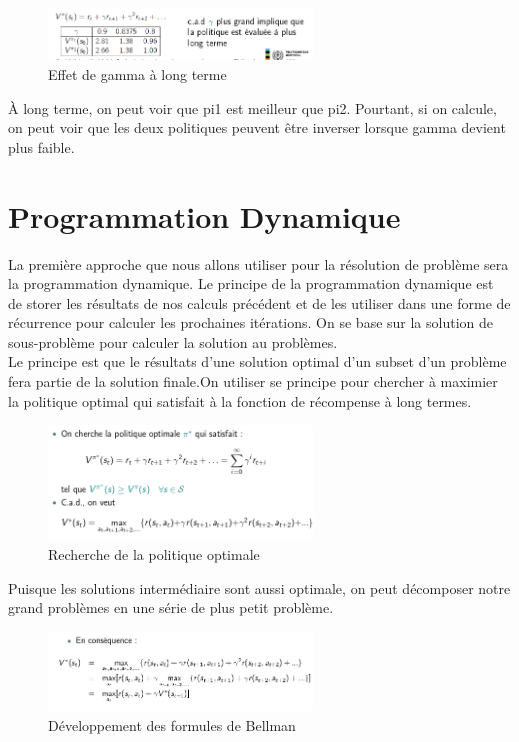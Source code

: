 \documentclass[oneside]{book}
\begin{document}
\begin{figure}[!ht]
\centering
\includegraphics[width = 7cm]{slide7.png}
\caption{Effet de gamma à long terme}
\end{figure}

À long terme, on peut voir que pi1 est meilleur que pi2. Pourtant, si on calcule, on peut voir que les deux politiques peuvent être inverser lorsque gamma devient plus faible. 
\section{Programmation Dynamique}
La première approche que nous allons utiliser pour la résolution de problème sera la programmation dynamique. Le principe de la programmation dynamique est de storer les résultats de nos calculs précédent et de les utiliser dans une forme de récurrence pour calculer les prochaines itérations. On se base sur la solution de sous-problème pour calculer la solution au problèmes. \\

Le principe est que le résultats d'une solution optimal d'un subset d'un problème fera partie de la solution finale.On utiliser se principe pour chercher à maximier la politique optimal qui satisfait à la fonction de récompense à long termes. \\

\begin{figure}[!ht]
\centering
\includegraphics[width = 7cm]{slide9.png}
\caption{Recherche de la politique optimale}
\end{figure}

Puisque les solutions intermédiaire sont aussi optimale, on peut décomposer notre grand problèmes en une série de plus petit problème. \\

\begin{figure}[!ht]
\centering
\includegraphics[width = 7cm]{slide10.png}
\caption{Développement des formules de Bellman}
\end{figure}
\end{document}
